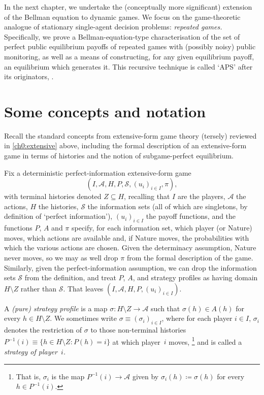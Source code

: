In the next chapter, we undertake the (conceptually more significant) extension of the Bellman equation to dynamic games. We focus on the game-theoretic analogue of stationary single-agent decision problems: \emph{repeated games.} Specifically, we prove a Bellman-equation-type characterisation of the set of perfect public equilibrium payoffs of repeated games with (possibly noisy) public monitoring, as well as a means of constructing, for any given equilibrium payoff, an equilibrium which generates it. This recursive technique is called `APS' after its originators, \textcite{AbreuPearceStacchetti1990}.



\section{Some concepts and notation}
\label{osdp:recap}

Recall the standard concepts from extensive-form game theory (tersely) reviewed in \cref{ch0:extensive} above, including the formal description of an extensive-form game in terms of histories and the notion of subgame-perfect equilibrium.

Fix a deterministic perfect-information extensive-form game
%
\begin{equation*}
	(I,\mathcal{A},H,P,\mathcal{S},(u_i)_{i \in I},\pi) ,
\end{equation*}
%
with terminal histories denoted $Z \subseteq H$, recalling that $I$ are the players, $\mathcal{A}$ the actions, $H$ the histories, $\mathcal{S}$ the information sets (all of which are singletons, by definition of `perfect information'), $(u_i)_{i \in I}$ the payoff functions, and the functions $P$, $A$ and $\pi$ specify, for each information set, which player (or Nature) moves, which actions are available and, if Nature moves, the probabilities with which the various actions are chosen.
Given the determinacy assumption, Nature never moves, so we may as well drop $\pi$ from the formal description of the game. Similarly, given the perfect-information assumption, we can drop the information sets $\mathcal{S}$ from the definition, and treat $P$, $A$, and strategy profiles as having domain $H \setminus Z$ rather than $\mathcal{S}$. That leaves $(I,\mathcal{A},H,P,(u_i)_{i \in I})$.

A \emph{(pure) strategy profile} is a map $\sigma : H \setminus Z \to \mathcal{A}$ such that $\sigma(h) \in A(h)$ for every $h \in H \setminus Z$. We sometimes write $\sigma \equiv (\sigma_i)_{i \in I}$, where for each player $i \in I$, $\sigma_i$ denotes the restriction of $\sigma$ to those non-terminal histories $P^{-1}(i) \equiv \{ h \in H \setminus Z : P(h) = i \}$ at which player~$i$ moves,%
	\footnote{That is, $\sigma_i$ is the map $P^{-1}(i) \to \mathcal{A}$ given by $\sigma_i(h) \coloneqq \sigma(h)$ for every $h \in P^{-1}(i)$.}
and is called a \emph{strategy of player~$i$.}


